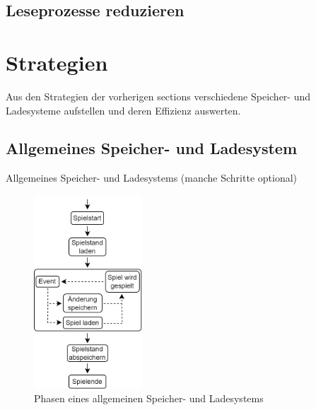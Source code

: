\subsection{Leseprozesse reduzieren}




\section{Strategien}
Aus den Strategien der vorherigen sections verschiedene Speicher- und Ladesysteme aufstellen und deren Effizienz auswerten.

\subsection{Allgemeines Speicher- und Ladesystem}
Allgemeines Speicher- und Ladesystems (manche Schritte optional)
\begin{figure}[htp]
    \centering
    \includegraphics[width=0.36\textwidth]{images/Speichersystem.png}
    \caption{Phasen eines allgemeinen Speicher- und Ladesystems}
    \label{fig:speicherphasen}
\end{figure}

